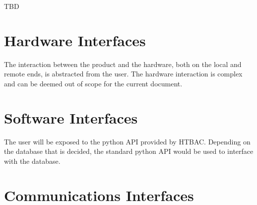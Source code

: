 \documentclass{scrreprt}
\begin{document}
TBD

\section{Hardware Interfaces}

The interaction between the product and the hardware, both on the local and remote ends, is abstracted from the user. The hardware interaction is complex and can be deemed out of scope for the current document.

\section{Software Interfaces}

The user will be exposed to the python API provided by HTBAC. Depending on the database that is decided, the standard python API would be used to interface with the database. 

\section{Communications Interfaces}
\end{document}
